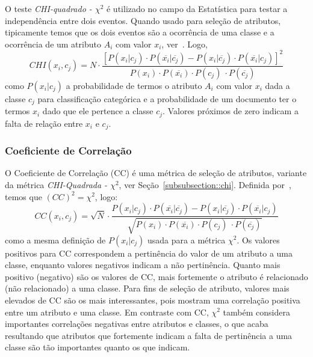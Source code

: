 O teste \textit{CHI-quadrado - $\chi^2$} é utilizado no campo da Estatística para testar a independência entre dois eventos. Quando usado para seleção de atributos, tipicamente temos que os dois eventos são a ocorrência de uma classe e a ocorrência de um atributo $A_i$ com valor $x_i$, ver~\cite{Zheng03}. Logo,
\begin{equation}\label{eqn::chi}
   CHI(x_i, c_j) = N \cdot \frac{ [ P(x_i|c_j) \cdot P(\overline{x_i}|\overline{c_j}) - P(x_i|\overline{c_j}) \cdot P(\overline{x_i}|c_j) ]^2 } {P(x_i) \cdot P(\overline{x_i}) \cdot P(c_j) \ \cdot P(\overline{c_j}) }
\end{equation}
como $P(x_i|c_j)$ a probabilidade de termos o atributo $A_i$ com valor $x_i$ dada a classe $c_j$ para classificação categórica e a probabilidade de um documento ter o termos $x_i$ dado que ele pertence a classe $c_j$. Valores próximos de zero indicam a falta de relação entre $x_i$ e $c_j$.

\subsubsection{Coeficiente de Correlação}
\label{subsubsection::cc}

O Coeficiente de Correlação (CC) é uma métrica de seleção de atributos, variante da métrica \textit{CHI-Quadrada - $\chi^2$}, ver Seção~\ref{subsubsection::chi}. Definida por~\cite{Ng97}, temos que $(CC)^2 = \chi^2$, logo:
\begin{equation}\label{eqn::ce}
   CC(x_i, c_j) = \sqrt{N} \cdot \frac{ P(x_i|c_j) \cdot P(\overline{x_i}|\overline{c_j}) - P(x_i|\overline{c_j}) \cdot P(\overline{x_i}|c_j) } {\sqrt{ P(x_i) \cdot P(\overline{x_i}) \cdot P(c_j) \ \cdot P(\overline{c_j}) } }
\end{equation}
como a mesma definição de $P(x_i|c_j)$ usada para a métrica $\chi^2$. Os valores positivos para CC correspondem a pertinência do valor de um atributo a uma classe, enquanto valores negativos indicam a não pertinência. Quanto mais positivo (negativo) são os valores de CC, mais fortemente o atributo é relacionado (não relacionado) a uma classe. Para fins de seleção de atributo, valores mais elevados de CC são os mais interessantes, pois mostram uma correlação positiva entre um atributo e uma classe. Em contraste com CC, $\chi^2$ também considera importantes correlações negativas entre atributos e classes, o que acaba resultando que atributos que fortemente indicam a falta de pertinência a uma classe são tão importantes quanto os que indicam.

